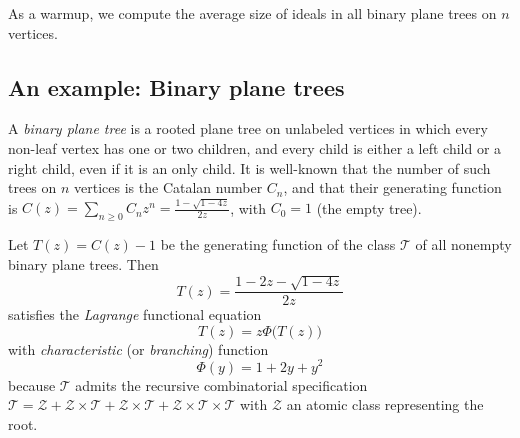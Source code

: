 \documentclass[10pt,a4paper]{amsart}
\theoremstyle{remark}
\begin{document}
As a warmup,  we compute the average size of ideals in all binary plane trees on $n$ vertices. 

\subsection{An example: Binary plane trees}
\label{sec:ExampleRed}

A {\em binary plane tree} is a rooted plane tree on unlabeled vertices in which every non-leaf vertex has one or two children, and every child is either a
left child or a right child, even if it is an only child. It is well-known that the number of such trees on $n$ vertices is the Catalan number $C_n$, and that
their generating function is $C(z)=\sum_{n\geq 0} C_nz^n=\frac{1-\sqrt{1-4z}}{2z}$, with $C_0=1$ (the empty tree).

Let $T(z)=C(z)-1$ be the generating function of the class $\mathcal T$ of all nonempty binary plane trees.  Then
 \begin{equation}
 \label{fort}
 	T(z)=\frac{1-2z-\sqrt{1-4z}}{2z}
\end{equation}
satisfies the \emph{Lagrange} functional equation
$$
	T(z)=z\Phi\big(T(z)\big)
$$
with \emph{characteristic} (or \emph{branching}) function
\begin{equation}
\label{eq:branchEqBinary}
	\Phi(y) = 1+2y+y^2
\end{equation}
because $\mathcal T$ admits the recursive combinatorial specification
$\mathcal T = \mathcal Z +\mathcal Z \times \mathcal T +\mathcal Z \times \mathcal T + \mathcal Z \times \mathcal T \times \mathcal T$
with $\mathcal Z$ an atomic class representing the root.
\end{document}
